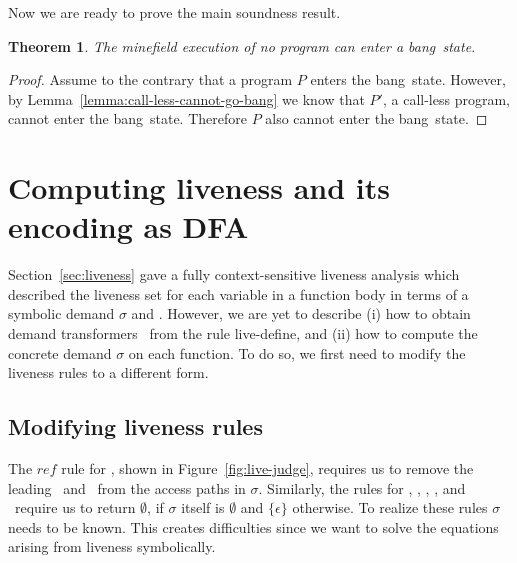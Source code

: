 \documentclass[preprint, 9pt]{sigplanconf}
\newcommand{\warning}[1]{{\color{Myred}{#1}}}
\newcommand{\bang}{\mbox{\sc bang}}
\newtheorem{theorem}{Theorem}[section]
\begin{document}
Now we are ready to prove the main soundness result.

\begin{theorem}
The  minefield  execution of  no  program  can enter  a
\bang\ state.
\end{theorem}
 
\begin{proof}
Assume to  the contrary that  a program $P$  enters the
\bang\  state.  \warning{We can  transform  $P$  to a  call-less
program $P'$ such that  the minefield executions of $P$
and $P'$  are identical  except for change  of variable
names. }             However,                 by
Lemma~\ref{lemma:call-less-cannot-go-bang} we know that
$P'$,   a   call-less   program,   cannot   enter   the
\bang\  state.  Therefore   $P$  also  cannot  enter  the
\bang\ state.
\end{proof}
 




\section{Computing liveness and its encoding as DFA}\label{sec:computing}
Section~\ref{sec:liveness}  gave   a  fully context-sensitive
liveness analysis which 
described the  liveness set for  each variable  in a function  body in
terms of  a symbolic demand  $\sigma$ and \Lfonly.  However,  we are yet
to describe  (i) how to obtain demand  transformers \Lfonly\ from
the  rule {\sc  live-define}, and  (ii)  how to  compute the  concrete
demand $\sigma$  on each function.   To do so,  we first need to  modify the
liveness rules to a different form.

\subsection{Modifying liveness rules}

The   $\mathit{ref}$   rule   for   \CONS,   shown   in
Figure~\ref{fig:live-judge}, requires us  to remove the
leading  \acar\ and  \acdr\  from the  access paths  in
$\sigma$.  Similarly, the rules  for \CAR, \CDR, \PRIM,
\NULLQ, and \SIF\ require  us to return $\emptyset$, if
$\sigma$      itself       is      $\emptyset$      and
$\lbrace\epsilon\rbrace$  otherwise.  To  realize these
rules  $\sigma$   needs  to  be  known.   This  creates
difficulties  since  we  want to  solve  the  equations
arising from liveness symbolically.
\end{document}
